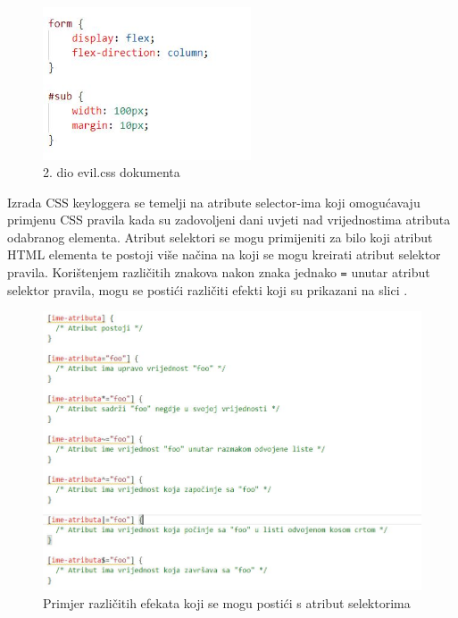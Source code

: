 \documentclass[12pt, oneside, onecolumn]{book}
\begin{document}
{\begin{figure}[H]
	\begin{center}
		\includegraphics[width=0.55\textwidth]{css_evil2.jpg}
		\caption{2. dio evil.css dokumenta} \label{fig:css_evil2}
	\end{center}
\end{figure}

Izrada CSS keyloggera se temelji na atribute selector-ima koji omogućavaju primjenu CSS pravila kada su zadovoljeni dani uvjeti nad vrijednostima atributa odabranog elementa. Atribut selektori se mogu primijeniti za bilo koji atribut HTML elementa te postoji više načina na koji se mogu kreirati atribut selektor pravila. Korištenjem različitih znakova nakon znaka jednako \texttt{=} unutar atribut selektor pravila, mogu se postići različiti efekti koji su prikazani na slici .

\begin{figure}[H]
	\begin{center}
		\includegraphics[width=\textwidth]{css_ate.jpg}
		\caption{Primjer različitih efekata koji se mogu postići s atribut selektorima} \label{fig:css_ate}
	\end{center}
\end{figure}

}
\end{document}
